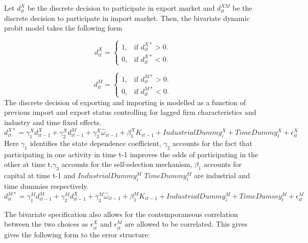 \documentclass[11pt]{article}
\begin{document}
Let $d_{it}^{X}$ be the discrete decision to participate in export
market and $d_{it}^{XM}$ be the discrete decision to participate in import
market.  Then, the bivariate dynamic probit model takes the following form 

\begin{equation}
  d_{it}^{X}=\begin{cases}
   1 , & \text{if $d_{it}^{X*}>  0$}.\\
   0 , & \text{if $d_{it}^{X*}<  0$}.
  \end{cases}
\end{equation}

\begin{equation}
  d_{it}^{M}=\begin{cases}
   1 , & \text{if $d_{it}^{M*}>  0$}.\\
   0 , & \text{if $d_{it}^{M*}<  0$}.
  \end{cases}
\end{equation}
The discrete decision of exporting and importing is modelled as a function of previous import and
export status controlling for lagged firm characteristics and industry and time fixed
effects. 
\begin{equation}
d_{it}^{X*} = \gamma_{1}^{X} d_{it-1}^{X} + \gamma_{2}^{X} d_{it-1}^{M}+
\gamma_{3}^{X} \hat{\omega}_{it-1}  + \beta_{1}^{X}K_{it-1}  +
IndustrialDummy_{i}^{X} + TimeDummy_{t}^{X}  + \epsilon_{it}^{X}
\end{equation}
Here $\gamma_{1}$ identifies the state dependence coefficient, $\gamma_{2}$ accounts for
the fact that participating in one activity in time t-1 improves the
odds of participating in the other at time t,$\gamma_{3}$ accounts for
the self-selection mechanism, $\beta_{1}$ accounts for capital at time
t-1 and $IndustrialDummy_{i}^{M}$  $TimeDummy_{t}^{M}$ are industrial
and time dummies respectively.
\begin{equation}
d_{it}^{M*} = \gamma_{1}^{M} d_{it-1}^{M} + \gamma_{2}^{M} d_{it-1}^{X}+
\gamma_{3}^{M} \hat{\omega}_{it-1}  + \beta_{1}^{M}K_{it-1}  +
IndustrialDummy_{i}^{M} + TimeDummy_{t}^{M}  + \epsilon_{it}^{M}
\end{equation}

The bivariate specification also allows for the
contemporaneous correlation between the two choices as
$\epsilon_{it}^{X}$ and $\epsilon_{it}^{M}$ are allowed to be
correlated. This gives gives the following form to the error
structure: 
\end{document}

